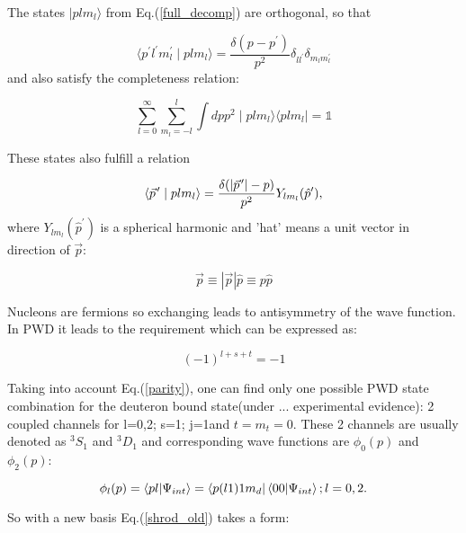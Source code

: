     The states $\mid p l m_l \rangle$ from Eq.(\ref{full_decomp}) are orthogonal, so that
    
    \begin{equation}
        \langle p^\prime l^\prime m_l^\prime \mid p l m_l \rangle = 
        \frac{\delta(p - p^\prime)}{p^2} \delta_{ll^\prime}\delta_{m_l m_l^\prime}
    \end{equation}
    and also satisfy the completeness relation:

    \begin{equation}
        \sum_{l=0}^\infty \sum_{m_l=-l}^l \int dp p^2 \mid plm_l \rangle \langle plm_l \mid = \mathbb{1}
    \end{equation}


    These states also fulfill a relation

    \begin{equation}
        \langle \pvec{p} \mid plm_l \rangle = 
        \frac{\delta ( \abs{\pvec{p}} - p)}{p^2} Y _{l m_l}(\hat{p}^\prime),
    \end{equation}
    where $Y _{l m_l}(\hat{p}^\prime)$ is a spherical harmonic and 'hat' means a unit vector in 
    direction of $\vec{p}$:

    \begin{equation}
        \vec{p} \equiv |\vec{p}| \hat{p} \equiv p \hat{p} 
        \label{hat}
    \end{equation}

    Nucleons are fermions so exchanging leads to antisymmetry of the
    wave function. In PWD it leads to the
    requirement which
    can be expressed as:

    \begin{equation}
        (-1)^{l+s+t} = -1
        \label{parity}
    \end{equation}

    Taking into account Eq.(\ref{parity}), one can find only one possible PWD state combination for 
    the deuteron bound state(under ... experimental evidence): 2 coupled channels for l=0,2; s=1; j=1and $t = m_t = 0$. 
    These 2 channels are usually denoted as $^3S_1$ and $^3D_1$ and
    corresponding wave functions are $\phi_0(p)$ and $\phi_2(p)$:
    
    \begin{equation}
        \phi_l(p) = \braket{pl}{\Psi_{int}} = \bra{p(l1)1m_d} \braket{00}{\Psi_{int}}; l=0,2.
        \label{deut_waves}
    \end{equation}

    So with a new basis Eq.(\ref{shrod_old}) takes a form:

